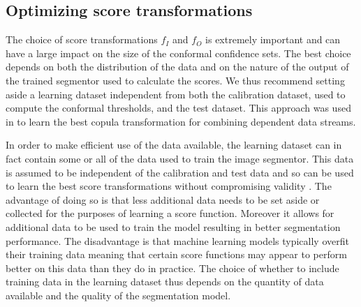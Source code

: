 \subsection{Optimizing score transformations}
The choice of score transformations $f_I$ and $f_O$ is extremely important and can have a large impact on the size of the conformal confidence sets. The best choice depends on both the distribution of the data and on the nature of the output of the trained segmentor used to calculate the scores. We thus recommend setting aside a learning dataset independent from both the calibration dataset, used to compute the conformal thresholds, and the test dataset. This approach was used in \cite{Sun2024} to learn the best copula transformation for combining dependent data streams.

In order to make efficient use of the data available, the learning dataset can in fact contain some or all of the data used to train the image segmentor. This data is assumed to be independent of the calibration and test data and so can be used to learn the best score transformations without compromising validity . The advantage of doing so is that less additional data needs to be set aside or collected for the purposes of learning a score function. Moreover it allows for additional data to be used to train the model resulting in better segmentation performance. The disadvantage is that machine learning models typically overfit their training data meaning that certain score functions may appear to perform better on this data than they do in practice. The choice of whether to include training data in the learning dataset thus depends on the quantity of data available and the quality of the segmentation model.

